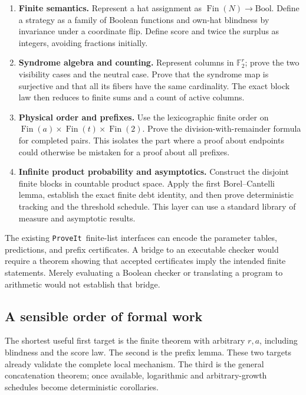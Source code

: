 \documentclass[11pt,letterpaper]{article}
\theoremstyle{definition}
\newcommand{\repo}{\texttt{ProveIt}}
\newcommand{\F}{\mathbb F}
\begin{document}
\begin{enumerate}
\item \textbf{Finite semantics.}
Represent a hat assignment as \(\operatorname{Fin}(N)\to\mathrm{Bool}\).
Define a strategy as a family of Boolean functions and own-hat
blindness by invariance under a coordinate flip. Define score and
twice the surplus as integers, avoiding fractions initially.

\item \textbf{Syndrome algebra and counting.}
Represent columns in \(\F_2^r\); prove the two visibility cases and
the neutral case. Prove that the syndrome map is surjective and
that all its fibers have the same cardinality. The exact block law
then reduces to finite sums and a count of active columns.

\item \textbf{Physical order and prefixes.}
Use the lexicographic finite order on
\(\operatorname{Fin}(a)\times\operatorname{Fin}(t)\times
\operatorname{Fin}(2)\). Prove the division-with-remainder formula
for completed pairs. This isolates the part where a proof about
endpoints could otherwise be mistaken for a proof about all prefixes.

\item \textbf{Infinite product probability and asymptotics.}
Construct the disjoint finite blocks in countable product space.
Apply the first Borel--Cantelli lemma, establish the exact finite
debt identity, and then prove deterministic tracking and the
threshold schedule. This layer can use a standard library of
measure and asymptotic results.
\end{enumerate}

The existing \repo\ finite-list interfaces can encode the parameter
tables, predictions, and prefix certificates. A bridge to an
executable checker would require a theorem showing that accepted
certificates imply the intended finite statements. Merely evaluating
a Boolean checker or translating a program to arithmetic would not
establish that bridge.

\subsection{A sensible order of formal work}

The shortest useful first target is the finite theorem with arbitrary
\(r,a\), including blindness and the score law. The second is the
prefix lemma. These two targets already validate the complete local
mechanism. The third is the general concatenation theorem; once
available, logarithmic and arbitrary-growth schedules become
deterministic corollaries.
\end{document}
